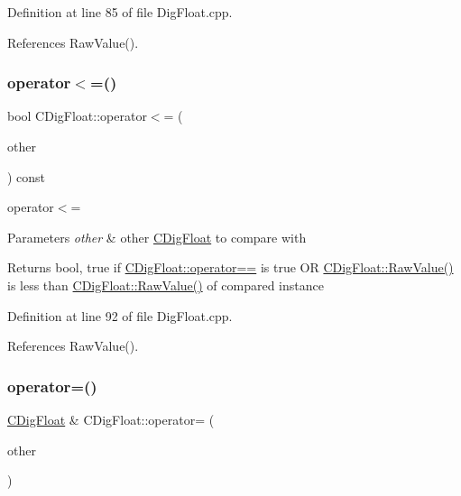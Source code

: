 Definition at line 85 of file Dig\+Float.\+cpp.



References Raw\+Value().

\mbox{\label{classCDigFloat_a0c49ab029c7f0c610db1d29425353558}} 
\subsubsection{\texorpdfstring{operator$<$=()}{operator<=()}}
{\footnotesize\ttfamily bool C\+Dig\+Float\+::operator$<$= (\begin{DoxyParamCaption}\item[{const \hyperlink{classCDigFloat}{C\+Dig\+Float} \&}]{other }\end{DoxyParamCaption}) const}



operator$<$= 


\begin{DoxyParams}{Parameters}
{\em other} & other \hyperlink{classCDigFloat}{C\+Dig\+Float} to compare with \\
\hline
\end{DoxyParams}
\begin{DoxyReturn}{Returns}
bool, true if \hyperlink{classCDigFloat_ad8980d984bf2bab71d15b830fd0180a5}{C\+Dig\+Float\+::operator==} is true OR \hyperlink{classCDigFloat_ab6d3001a549d7496156321cbb26dde51}{C\+Dig\+Float\+::\+Raw\+Value()} is less than \hyperlink{classCDigFloat_ab6d3001a549d7496156321cbb26dde51}{C\+Dig\+Float\+::\+Raw\+Value()} of compared instance 
\end{DoxyReturn}


Definition at line 92 of file Dig\+Float.\+cpp.



References Raw\+Value().

\mbox{\label{classCDigFloat_a74f36566c2c79d7258b7b2dee35d46b2}} 
\subsubsection{\texorpdfstring{operator=()}{operator=()}\hspace{0.1cm}{\footnotesize\ttfamily [1/2]}}
{\footnotesize\ttfamily \hyperlink{classCDigFloat}{C\+Dig\+Float} \& C\+Dig\+Float\+::operator= (\begin{DoxyParamCaption}\item[{const \hyperlink{classCDigFloat}{C\+Dig\+Float} \&}]{other }\end{DoxyParamCaption})}



